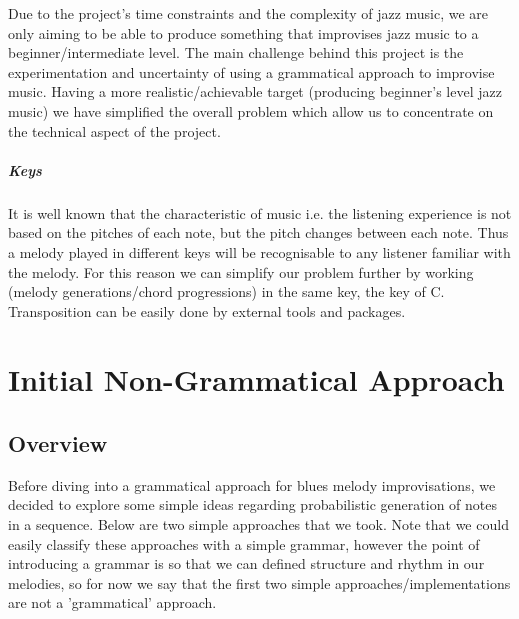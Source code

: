 \documentclass[pdftex,12pt,a4paper]{report}
\begin{document}
Due to the project's time constraints and the complexity of jazz music, we are only aiming to be able to produce something that improvises jazz music to a beginner/intermediate level. The main challenge behind this project is the experimentation and uncertainty of using a grammatical approach to improvise music. Having a more realistic/achievable target (producing beginner's level jazz music) we have simplified the overall problem which allow us to concentrate on the technical aspect of the project.

\paragraph{Keys}
It is well known that the characteristic of music i.e. the listening experience is not based on the pitches of each note, but the pitch changes between each note. Thus a melody played in different keys will be recognisable to any listener familiar with the melody. For this reason we can simplify our problem further by working (melody generations/chord progressions) in the same key, the key of C. Transposition can be easily done by external tools and packages.

\pagebreak

\chapter{Initial Non-Grammatical Approach}

\section{Overview}
Before diving into a grammatical approach for blues melody improvisations, we decided to explore some simple ideas regarding probabilistic generation of notes in a sequence. Below are two simple approaches that we took. Note that we could easily classify these approaches with a simple grammar, however the point of introducing a grammar is so that we can defined structure and rhythm in our melodies, so for now we say that the first two simple approaches/implementations are not a 'grammatical' approach. 
\end{document}
